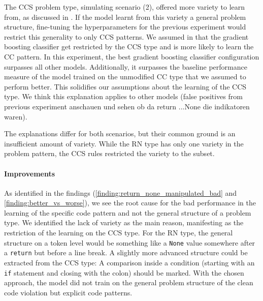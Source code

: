 The CCS problem type, simulating scenario (2), offered more variety to learn from, as discussed in . If the model learnt from this variety a general problem structure, fine-tuning the hyperparameters for the previous experiment would restrict this generality to only CCS patterns. We assumed in  that the gradient boosting classifier get restricted by the CCS type and is more likely to learn the CC pattern. In this experiment, the best gradient boosting classifier configuration surpasses all other models. Additionally, it surpasses the baseline performance measure of the model trained on the unmodified CC type that we assumed to perform better. This solidifies our assumptions about the learning of the CCS type. We think this explanation applies to other models (false positives from previous experiment anschauen und sehen ob da return ...None die indikatoren waren).

The explanations differ for both scenarios, but their common ground is an insufficient amount of variety. While the RN type has only one variety in the problem pattern, the CCS rules restricted the variety to the subset.

\paragraph{Improvements}
As identified in the findings (\ref{finding:return_none_manipulated_bad} and \ref{finding:better_vs_worse}), we see the root cause for the bad performance in the learning of the specific code pattern and not the general structure of a problem type. We identified the lack of variety as the main reason, manifesting as the restriction of the learning on the CCS type. For the RN type, the general structure on a token level would be something like a \texttt{None} value somewhere after a \texttt{return} but before a line break. A slightly more advanced structure could be extracted from the CCS type: A comparison inside a condition (starting with an \texttt{if} statement and closing with the colon) should be marked. With the chosen approach, the model did not train on the general problem structure of the clean code violation but explicit code patterns. 

